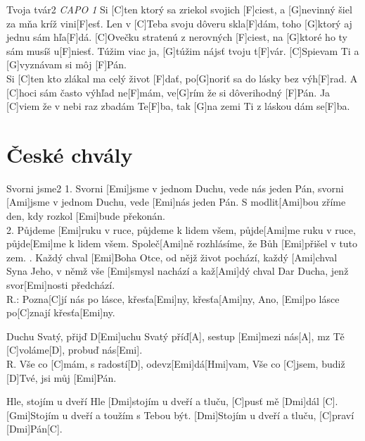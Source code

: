 \documentclass[12pt]{article}
\begin{document}
\begin{song}{Tvoja tvár}{2}
	\textit{\color{gray}CAPO 1}
	Si [C]ten ktorý sa zriekol svojich [F]ciest,
	a [G]nevinný šiel za mňa kríž vini[F]esť.
	Len v [C]Teba svoju dôveru skla[F]dám,
	toho [G]ktorý aj jednu sám hľa[F]dá.
	[C]Ovečku stratenú z nerovných [F]ciest,
	na [G]ktoré ho ty sám musíš u[F]niesť.
	\columnbreak
	[C]Túžim viac ja, [G]túžim nájsť tvoju t[F]vár.
	[C]Spievam Ti a [G]vyznávam si môj [F]Pán.
	\\
	Si [C]ten kto zlákal ma celý život [F]dať,
	po[G]noriť sa do lásky bez výh[F]rad.
	A [C]hoci sám často výhľad ne[F]mám,
	ve[G]rím že si dôverihodný [F]Pán.
	Ja [C]viem že v nebi raz zbadám Te[F]ba,
	tak [G]na zemi Ti z láskou dám se[F]ba.
\end{song}

\newpage

\section{České chvály}
	
\begin{song}{Svorni jsme}{2}
	1. Svorni [Emi]jsme v jednom Duchu, 
	vede nás jeden Pán,
	svorni [Ami]jsme v jednom Duchu, 
	vede [Emi]nás jeden Pán.
	S modlit[Ami]bou zříme den, 
	kdy rozkol [Emi]bude překonán.
	\\
	2. Půjdeme [Emi]ruku v ruce, 
	půjdeme k lidem všem,
	půjde[Ami]me ruku v ruce, 
	půjde[Emi]me k lidem všem.
	Společ[Ami]ně rozhlásíme, 
	že Bůh [Emi]přišel v tuto zem.
	. Každý chval [Emi]Boha Otce, 
	od nějž život pochází,
	každý [Ami]chval Syna Jeho, 
	v němž vše [Emi]smysl nachází
	a kaž[Ami]dý chval Dar Ducha, 
	jenž svor[Emi]nosti předchází.
	\\
	R.: Pozna[C]jí nás po lásce, 
	křesťa[Emi]ny, křesťa[Ami]ny,
	Ano, [Emi]po lásce po[C]znají křesťa[Emi]ny.
\end{song}

\begin{songgroup}{2}
\begin{groupitem}{Duchu Svatý, přijď}
	D[Emi]uchu Svatý příď[A], sestup [Emi]mezi nás[A],
	mz Tě [C]voláme[D], probuď nás[Emi].
	\\
	R. Vše co [C]mám, s radostí[D], odevz[Emi]dá[Hmi]vam,
	Vše co [C]jsem, budiž [D]Tvé, jsi můj [Emi]Pán.	
\end{groupitem}
\columnbreak
	
\begin{groupitem}{Hle, stojím u dveří}
	Hle [Dmi]stojím u dveří a tluču, [C]pusť mě [Dmi]dál [C].
	[Gmi]Stojím u dveří a toužím s Tebou být.
	[Dmi]Stojím u dveří a tluču, [C]praví [Dmi]Pán[C].
\end{groupitem}

\end{songgroup}
	
\end{document}
